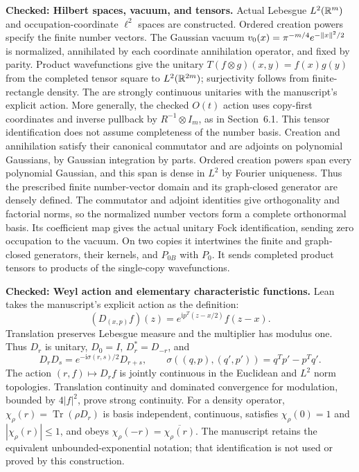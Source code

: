 \begin{lemma}
  \textbf{Checked: Hilbert spaces, vacuum, and tensors.}
  Actual Lebesgue $L^2(\mathbb{R}^m)$ and occupation-coordinate $\ell^2$ spaces are
  constructed. Ordered creation powers specify the finite number vectors.
  The Gaussian vacuum $v_0(x)=\pi^{-m/4}e^{-\lVert x \rVert^2/2}$ is normalized,
  annihilated by each coordinate annihilation operator, and fixed by parity.
  Product wavefunctions give the unitary
  $T(f\otimes g)(x,y)=f(x)g(y)$ from the completed tensor square to
  $L^2(\mathbb{R}^{2m})$; surjectivity follows from finite-rectangle density.
  The 
  are strongly continuous unitaries with the manuscript's explicit action.
  More generally, the checked $O(t)$ action uses copy-first coordinates and
  inverse pullback by $R^{-1}\otimes I_m$, as in Section~6.1.
  This tensor identification does not assume completeness of the number basis.
  Creation and annihilation satisfy their canonical commutator and are adjoints
  on polynomial Gaussians, by Gaussian integration by parts. Ordered creation
  powers span every polynomial Gaussian, and this span is dense in $L^2$ by
  Fourier uniqueness. Thus the prescribed finite number-vector domain and its
  graph-closed generator are densely defined. The commutator and adjoint
  identities give orthogonality and factorial norms, so the normalized number
  vectors form a complete orthonormal basis. Its coefficient map gives the
  actual unitary Fock identification, sending zero occupation to the vacuum.
  On two copies it intertwines the finite and graph-closed generators, their
  kernels, and $P_{0B}$ with $P_0$. It sends completed product tensors to
  products of the single-copy wavefunctions.

  \textbf{Checked: Weyl action and elementary characteristic functions.}
  Lean takes the manuscript's explicit action as the definition:
  \[
    (D_{(x,p)}f)(z)=e^{\mathrm{i}p^T(z-x/2)}f(z-x).
  \]
  Translation preserves Lebesgue measure and the multiplier has modulus one.
  Thus $D_r$ is unitary, $D_0=I$, $D_r^*=D_{-r}$, and
  \[
    D_rD_s=e^{-\mathrm{i}\sigma(r,s)/2}D_{r+s},\qquad
    \sigma((q,p),(q',p'))=q^Tp'-p^Tq'.
  \]
  The action $(r,f)\mapsto D_rf$ is jointly continuous in the Euclidean and
  $L^2$ norm topologies. Translation continuity and dominated convergence
  for modulation, bounded by $4|f|^2$, prove strong continuity.
  For a density operator, $\chi_\rho(r)=\operatorname{Tr}(\rho D_r)$ is
  basis independent, continuous, satisfies $\chi_\rho(0)=1$ and
  $|\chi_\rho(r)|\le1$, and obeys
  $\chi_\rho(-r)=\overline{\chi_\rho(r)}$.
  The manuscript retains the equivalent unbounded-exponential notation;
  that identification is not used or proved by this construction.


\end{lemma}
